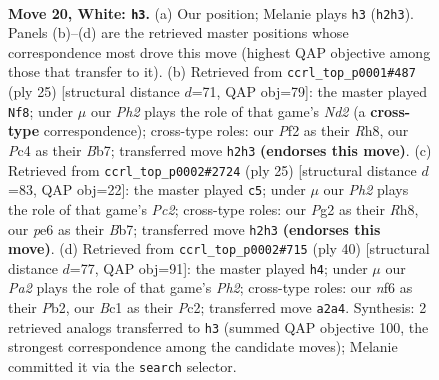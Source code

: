 \documentclass[11pt]{article}
\begin{document}
\clearpage

\begin{figure}[p]\centering
\begin{subfigure}{0.46\textwidth}\centering
\resizebox{\linewidth}{!}{%
\newchessgame
\chessboard[
  setfen={1rb2rk1/p3np1p/1p2pnp1/2P5/2P5/4PB2/P1N2PPP/1RB1R1K1 w - - 2 20},
  showmover=false,
  pgfstyle=straightmove, color=movearrow, markmove={h2-h3}
]}
\caption{}
\end{subfigure}\hfill
\begin{subfigure}{0.46\textwidth}\centering
\resizebox{\linewidth}{!}{%
\newchessgame
\chessboard[
  setfen={r3k2r/pb1n1ppp/1p3b2/2pp4/3P4/P1N1PNP1/1P3P1P/R3KB1R b KQkq - 0 13},
  showmover=false,
  pgfstyle=straightmove, color=movearrow, markmove={d7-f8}
]}
\caption{}
\end{subfigure}
\\[4pt]
\begin{subfigure}{0.46\textwidth}\centering
\resizebox{\linewidth}{!}{%
\newchessgame
\chessboard[
  setfen={r2k3r/1bpn1ppp/pp3b2/3p4/3P4/P1N1PN2/1P3PPP/R3KB1R b KQ - 1 13},
  showmover=false,
  pgfstyle=straightmove, color=movearrow, markmove={c7-c5}
]}
\caption{}
\end{subfigure}\hfill
\begin{subfigure}{0.46\textwidth}\centering
\resizebox{\linewidth}{!}{%
\newchessgame
\chessboard[
  setfen={r1br2k1/5pp1/2p1pn1p/p2p4/N3P1P1/5P2/PPPRB2P/2K2R2 w - - 0 21},
  showmover=false,
  pgfstyle=straightmove, color=movearrow, markmove={h2-h4}
]}
\caption{}
\end{subfigure}
\caption{\textbf{Move 20, White: \texttt{h3}.} (a) Our position; Melanie plays \texttt{h3} (\texttt{h2h3}). Panels (b)--(d) are the retrieved master positions whose correspondence most drove this move (highest QAP objective among those that transfer to it). (b) Retrieved from \texttt{ccrl\_top\_p0001\#487} (ply 25) [structural distance $d$=71, QAP obj=79]: the master played \texttt{Nf8}; under $\mu$ our \emph{Ph2} plays the role of that game's \emph{Nd2} (a \textbf{cross-type} correspondence); cross-type roles: our \emph{P}f2 as their \emph{R}h8, our \emph{P}c4 as their \emph{B}b7; transferred move \texttt{h2h3} \textbf{(endorses this move)}. (c) Retrieved from \texttt{ccrl\_top\_p0002\#2724} (ply 25) [structural distance $d$=83, QAP obj=22]: the master played \texttt{c5}; under $\mu$ our \emph{Ph2} plays the role of that game's \emph{Pc2}; cross-type roles: our \emph{P}g2 as their \emph{R}h8, our \emph{p}e6 as their \emph{B}b7; transferred move \texttt{h2h3} \textbf{(endorses this move)}. (d) Retrieved from \texttt{ccrl\_top\_p0002\#715} (ply 40) [structural distance $d$=77, QAP obj=91]: the master played \texttt{h4}; under $\mu$ our \emph{Pa2} plays the role of that game's \emph{Ph2}; cross-type roles: our \emph{n}f6 as their \emph{P}b2, our \emph{B}c1 as their \emph{P}c2; transferred move \texttt{a2a4}. Synthesis: 2 retrieved analogs transferred to \texttt{h3} (summed QAP objective 100, the strongest correspondence among the candidate moves); Melanie committed it via the \texttt{search} selector.}
\label{fig:thought-m38}
\end{figure}
\end{document}
